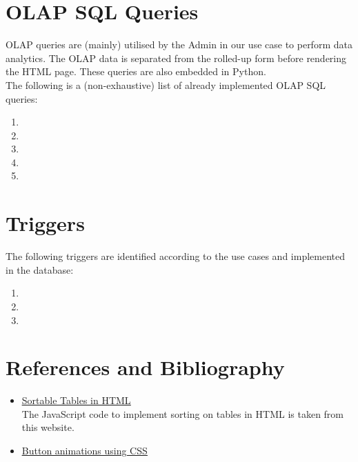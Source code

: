 \documentclass[12pt]{report}
\begin{document}
    \section*{\Huge OLAP SQL Queries}
    \vspace*{10pt}

    OLAP queries are (mainly) utilised by the Admin in our use case to perform data analytics.
    The OLAP data is separated from the rolled-up form before rendering the HTML page. These queries are also embedded in Python.
    \vspace*{10pt} \\
    The following is a (non-exhaustive) list of already implemented OLAP SQL queries:

    \begin{enumerate}
        \item 
        \item 
        \item 
        \item 
        \item 
    \end{enumerate}

    \section*{\Huge Triggers}

    The following triggers are identified according to the use cases and implemented in the database:

    \begin{enumerate}
        \item 
        \item 
        \item 
    \end{enumerate}

    \vfill \pagebreak

    \section*{References and Bibliography}

    \begin{itemize}
        \item \href{https://mdbootstrap.com/docs/b4/jquery/tables/sort/}{\color{blue}\underline{Sortable Tables in HTML}} \\
        The JavaScript code to implement sorting on tables in HTML is taken from this website.
        \item \href{https://www.w3schools.com/howto/howto_css_animate_buttons.asp}{\color{blue}\underline{Button animations using CSS}}
    \end{itemize}
\end{document}
